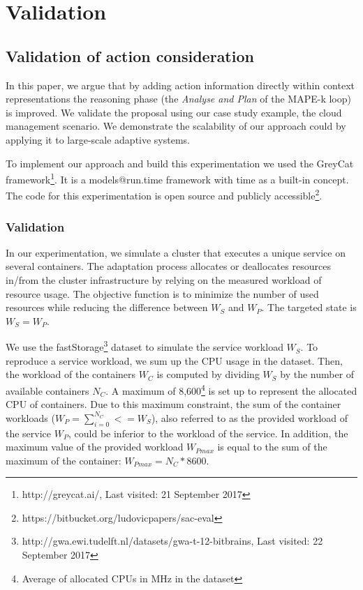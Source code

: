 \section{Validation}
\label{sec:tkm:validation}

\subsection{Validation of action consideration}

In this paper, we argue that by adding action information directly within context representations the reasoning phase (\ie the \textit{Analyse and Plan} of the MAPE-k loop) is improved.
We validate the proposal using our case study example, the cloud management scenario.
We demonstrate the scalability of our approach could by applying it to large-scale adaptive systems.

To implement our approach and build this experimentation we used the GreyCat framework\footnote{http://greycat.ai/, Last visited: 21 September 2017}.
It is a models@run.time framework with time as a built-in concept\cite{DBLP:phd/basesearch/Hartmann16}.
The code for this experimentation is open source and publicly accessible\footnote{https://bitbucket.org/ludovicpapers/sac-eval}.

\subsubsection{Validation}
\label{sec:evaluation_setup}

In our experimentation, we simulate a cluster that executes a unique service on several containers.
The adaptation process allocates or deallocates resources in/from the cluster infrastructure by relying on the measured workload of resource usage.
The objective function is to minimize the number of used resources while reducing the difference between $W_S$ and $W_P$.
The targeted state is $W_S = W_P$.

We use the fastStorage\footnote{http://gwa.ewi.tudelft.nl/datasets/gwa-t-12-bitbrains, Last visited: 22 September 2017} dataset\cite{DBLP:conf/ccgrid/ShenBI15} to simulate the service workload  $W_S$.
To reproduce a service workload, we sum up the CPU usage in the dataset.
Then, the workload of the containers $W_C$ is computed by dividing $W_S$ by the number of available containers $N_C$.
A maximum of 8,600\footnote{Average of allocated CPUs in MHz in the dataset} is set up to represent the allocated CPU of containers.
Due to this maximum constraint, the sum of the container workloads ($W_P = \sum_{i=0}^{N_C} <= W_S$), also referred to as the provided workload of the service $W_P$, could be inferior to the workload of the service.
In addition, the maximum value of the provided workload $W_{Pmax}$ is equal to the sum of the maximum of the container: $W_{Pmax} = N_C * 8600$.

